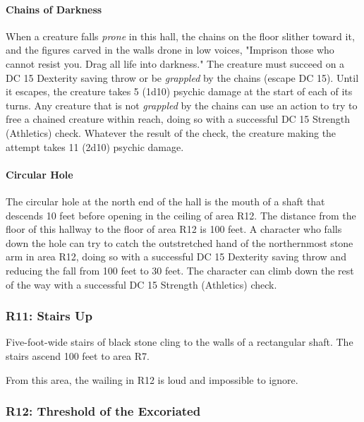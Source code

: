 \documentclass[a4paper, 11pt, bg=full, twocolumn, nooutline]{dndbook}
\begin{document}
\paragraph{Chains of Darkness}

When a creature falls \textit{prone} in this hall, the chains on the floor slither toward it, and the figures carved in the walls drone in low voices, "Imprison those who cannot resist you. Drag all life into darkness." The creature must succeed on a DC 15 Dexterity saving throw or be \textit{grappled} by the chains (escape DC 15). Until it escapes, the creature takes 5 (1d10) psychic damage at the start of each of its turns. Any creature that is not \textit{grappled} by the chains can use an action to try to free a chained creature within reach, doing so with a successful DC 15 Strength (Athletics) check. Whatever the result of the check, the creature making the attempt takes 11 (2d10) psychic damage.

\paragraph{Circular Hole}

The circular hole at the north end of the hall is the mouth of a shaft that descends 10 feet before opening in the ceiling of area R12. The distance from the floor of this hallway to the floor of area R12 is 100 feet. A character who falls down the hole can try to catch the outstretched hand of the northernmost stone arm in area R12, doing so with a successful DC 15 Dexterity saving throw and reducing the fall from 100 feet to 30 feet. The character can climb down the rest of the way with a successful DC 15 Strength (Athletics) check.

\subsubsection{R11: Stairs Up}

Five-foot-wide stairs of black stone cling to the walls of a rectangular shaft. The stairs ascend 100 feet to area R7.

From this area, the wailing in R12 is loud and impossible to ignore.

\subsubsection{R12: Threshold of the Excoriated}
\end{document}

